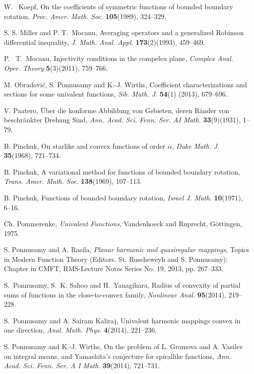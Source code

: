 \documentclass[a4paper,12pt]{amsart}
\theoremstyle{definition}
\begin{document}
\begin{thebibliography}{150}
 W.~ Koepf,
\textrm{On the coefficients of symmetric functions of bounded boundary rotation},
\textit{Proc. Amer. Math. Soc.} {\bf 105}(1989), 324--329.

 S. S. Miller and P. T.~Mocanu,
\textrm{Averaging operators and a generalized Robinson differential inequality},
\textit{J. Math. Anal. Appl.} \textbf{173}(2)(1993), 459--469.

 P.~ T.~Mocanu,
\textrm{Injectivity conditions in the compelex plane},
\textit{Complex Anal. Oper. Theory} \textbf{5}(3)(2011), 759--766.

 M. Obradovi\'{c}, S. Ponnusamy and K.-J. Wirths,
\textrm{Coefficient characterizations and sections for some univalent functions},
\textit{Sib. Math. J.} \textbf{54}(1) (2013), 679--696.

 V. Paatero,
\"Uber die konforme Abbildung von Gebieten, deren R\"ander von beschr\"ankter Drehung Sind,
\textit{Ann. Acad. Sci. Fenn. Ser. AI Math.} \textbf{33}(9)(1931), 1--79.

 B. Pinchuk,
On starlike and convex functions of order $\alpha$,
\textit{Duke Math. J.} \textbf{35}(1968), 721--734.

 B. Pinchuk,
A variational method for functions of bounded boundary rotation,
\textit{Trans. Amer. Math. Soc.} \textbf{138}(1969), 107--113.

 B. Pinchuk,
Functions of bounded boundary rotation,
\textit{Israel J. Math.} \textbf{10}(1971), 6--16.

 Ch. Pommerenke,
\emph{Univalent Functions}, Vandenhoeck and
Ruprecht, G\"ottingen, 1975.

 S. Ponnusamy and A. Rasila,
\textit{Planar harmonic and quasiregular mappings},
Topics in Modern Function Theory (Editors. St. Ruscheweyh and S. Ponnusamy): Chapter in
CMFT, RMS-Lecture Notes Series No. 19, 2013, pp. 267--333.

 S.~Ponnusamy, S.~K. Sahoo and H.~Yanagihara,
\textrm{Radius of convexity of partial sums of functions in the close-to-convex family},
\textit{Nonlinear Anal.} {\bf 95}(2014), 219--228.

 S.~Ponnusamy and A. Sairam Kaliraj,
\textrm{Univalent harmonic mappings convex in one direction},
\textit{Anal. Math. Phys.} \textbf{4}(2014), 221--236.

 S. Ponnusamy and K.-J. Wirths,
\textrm{On the problem of L. Gromova and A. Vasilev on integral means, and Yamashita's conjecture
for spirallike functions},
\textit{Ann. Acad. Sci. Fenn. Ser. A I Math.} \textbf{39}(2014), 721--731.


\end{thebibliography}
\end{document}
